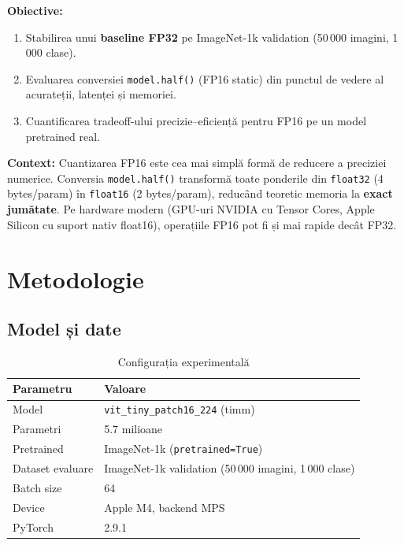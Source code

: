 \documentclass[12pt,a4paper]{article}
\begin{document}
\textbf{Obiective:}
\begin{enumerate}
  \item Stabilirea unui \textbf{baseline FP32} pe ImageNet-1k validation
    (50\,000 imagini, 1\,000 clase).
  \item Evaluarea conversiei \texttt{model.half()} (FP16 static) din punctul
    de vedere al acurateții, latenței și memoriei.
  \item Cuantificarea tradeoff-ului precizie--eficiență pentru FP16 pe un
    model pretrained real.
\end{enumerate}

\textbf{Context:} Cuantizarea FP16 este cea mai simplă formă de reducere a
preciziei numerice. Conversia \texttt{model.half()} transformă toate ponderile
din \texttt{float32} (4 bytes/param) în \texttt{float16} (2 bytes/param),
reducând teoretic memoria la \textbf{exact jumătate}. Pe hardware modern
(GPU-uri NVIDIA cu Tensor Cores, Apple Silicon cu suport nativ float16),
operațiile FP16 pot fi și mai rapide decât FP32.

\section{Metodologie}

\subsection{Model și date}

\begin{table}[H]
  \centering
  \caption{Configurația experimentală}
  \begin{tabular}{ll}
    \toprule
    \textbf{Parametru} & \textbf{Valoare} \\
    \midrule
    Model             & \texttt{vit\_tiny\_patch16\_224} (timm) \\
    Parametri         & 5.7 milioane \\
    Pretrained        & ImageNet-1k (\texttt{pretrained=True}) \\
    Dataset evaluare  & ImageNet-1k validation (50\,000 imagini, 1\,000 clase) \\
    Batch size        & 64 \\
    Device            & Apple M4, backend MPS \\
    PyTorch           & 2.9.1 \\
    \bottomrule
  \end{tabular}
  \label{tab:config_fp16}
\end{table}
\end{document}
